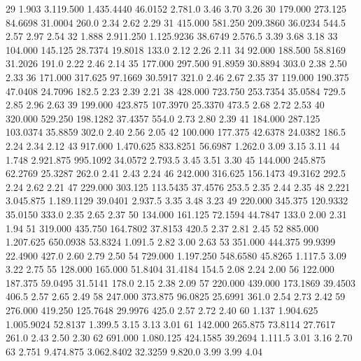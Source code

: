 \documentclass[12pt]{article}
\begin{document}
\begin{Schunk}
\begin{Soutput}
29    1.903  3.119.500 1.435.4440 46.0152  2.781.0    3.46    3.70    3.26
30  179.000    273.125    84.6698 31.0004    260.0    2.34    2.62    2.29
31  415.000    581.250   209.3860 36.0234    544.5    2.57    2.97    2.54
32    1.888  2.911.250 1.125.9236 38.6749  2.576.5    3.39    3.68    3.18
33  104.000    145.125    28.7374 19.8018    133.0    2.12    2.26    2.11
34   92.000    188.500    58.8169 31.2026    191.0    2.22    2.46    2.14
35  177.000    297.500    91.8959 30.8894    303.0    2.38    2.50    2.33
36  171.000    317.625    97.1669 30.5917    321.0    2.46    2.67    2.35
37  119.000    190.375    47.0408 24.7096    182.5    2.23    2.39    2.21
38  428.000    723.750   253.7354 35.0584    729.5    2.85    2.96    2.63
39  199.000    423.875   107.3970 25.3370    473.5    2.68    2.72    2.53
40  320.000    529.250   198.1282 37.4357    554.0    2.73    2.80    2.39
41  184.000    287.125   103.0374 35.8859    302.0    2.40    2.56    2.05
42  100.000    177.375    42.6378 24.0382    186.5    2.24    2.34    2.12
43  917.000  1.470.625   833.8251 56.6987  1.262.0    3.09    3.15    3.11
44    1.748  2.921.875   995.1092 34.0572  2.793.5    3.45    3.51    3.30
45  144.000    245.875    62.2769 25.3287    262.0    2.41    2.43    2.24
46  242.000    316.625   156.1473 49.3162    292.5    2.24    2.62    2.21
47  229.000    303.125   113.5435 37.4576    253.5    2.35    2.44    2.35
48    2.221  3.045.875 1.189.1129 39.0401  2.937.5    3.35    3.48    3.23
49  220.000    345.375   120.9332 35.0150    333.0    2.35    2.65    2.37
50  134.000    161.125    72.1594 44.7847    133.0    2.00    2.31    1.94
51  319.000    435.750   164.7802 37.8153    420.5    2.37    2.81    2.45
52  885.000  1.207.625   650.0938 53.8324  1.091.5    2.82    3.00    2.63
53  351.000    444.375    99.9399 22.4900    427.0    2.60    2.79    2.50
54  729.000  1.197.250   548.6580 45.8265  1.117.5    3.09    3.22    2.75
55  128.000    165.000    51.8404 31.4184    154.5    2.08    2.24    2.00
56  122.000    187.375    59.0495 31.5141    178.0    2.15    2.38    2.09
57  220.000    439.000   173.1869 39.4503    406.5    2.57    2.65    2.49
58  247.000    373.875    96.0825 25.6991    361.0    2.54    2.73    2.42
59  276.000    419.250   125.7648 29.9976    425.0    2.57    2.72    2.40
60    1.137  1.904.625 1.005.9024 52.8137  1.399.5    3.15    3.13    3.01
61  142.000    265.875    73.8114 27.7617    261.0    2.43    2.50    2.30
62  691.000  1.080.125   424.1585 39.2694  1.111.5    3.01    3.16    2.70
63    2.751  9.474.875 3.062.8402 32.3259  9.820.0    3.99    3.99    4.04

\end{Soutput}
\end{Schunk}
\end{document}
